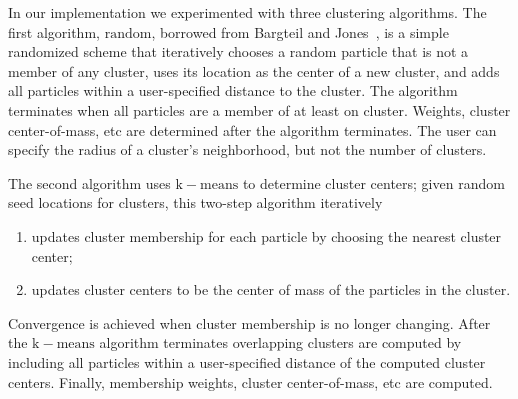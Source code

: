\documentclass[review]{acmsiggraph}
\begin{document}
In our implementation we experimented with three clustering algorithms.  The first algorithm, $\mathrm{random}$,
borrowed from Bargteil and Jones~, is a simple randomized scheme that iteratively
chooses a random particle that is not a member of any cluster,
uses its location as the center of a new cluster, and adds all particles within a user-specified distance to the cluster.  
The algorithm terminates when all particles are a member of at least on cluster.  Weights, cluster center-of-mass, etc are
determined after the algorithm terminates.  The user can specify the radius of a cluster's neighborhood, but not the number of clusters.

The second algorithm uses $\mathrm{k-means}$ to determine cluster centers; given random seed locations for clusters, this two-step algorithm iteratively
\begin{enumerate}
\item updates cluster membership for each particle by choosing the nearest cluster center;
\item updates cluster centers to be the center of mass of the particles in the cluster.
\end{enumerate}
Convergence is achieved when cluster membership is no longer changing.  
After the $\mathrm{k-means}$ algorithm terminates overlapping clusters are computed by including
all particles within a user-specified distance of the computed cluster centers.  Finally, membership weights, cluster center-of-mass, etc are computed.
\end{document}

